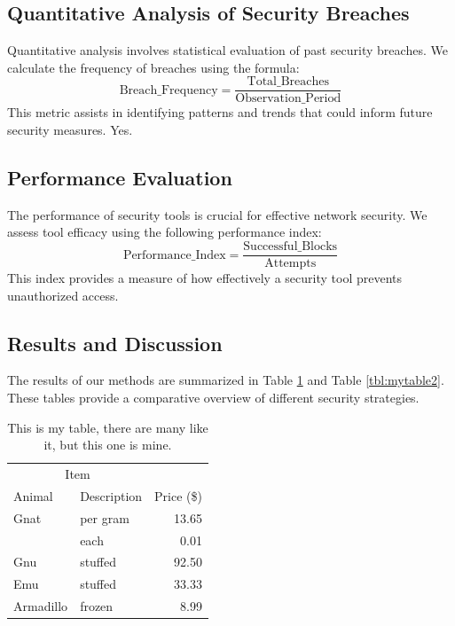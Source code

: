 \documentclass[a4paper,conference]{IEEEtran}
\begin{document}
\subsection{Quantitative Analysis of Security Breaches}

Quantitative analysis involves statistical evaluation of past security breaches.
We calculate the frequency of breaches using the formula:
\begin{equation}
\text{Breach\_Frequency} = \frac{\text{Total\_Breaches}}{\text{Observation\_Period}}
\end{equation}
This metric assists in identifying patterns and trends that could inform future security measures.
Yes.


\subsection{Performance Evaluation}

The performance of security tools is crucial for effective network security.
We assess tool efficacy using the following performance index:
\begin{equation}
\text{Performance\_Index} = \frac{\text{Successful\_Blocks}}{\text{Attempts}}
\end{equation}
This index provides a measure of how effectively a security tool prevents unauthorized access.

\subsection{Results and Discussion}

The results of our methods are summarized in Table \ref{tbl:mytable} and Table \ref{tbl:mytable2}.
These tables provide a comparative overview of different security strategies.

\begin{table}
    \centering
    \caption{This is my table, there are many like it, but this one is mine.}
    \label{tbl:mytable}
    \begin{tabular}{llr}
    \toprule
    \multicolumn{2}{c}{Item} \\
    \cmidrule(r){1-2}
    Animal & Description & Price (\$) \\
    \midrule
    Gnat  & per gram & 13.65 \\
          & each     &  0.01 \\
    Gnu   & stuffed  & 92.50 \\
    Emu   & stuffed  & 33.33 \\
    Armadillo & frozen & 8.99 \\
    \bottomrule
    \end{tabular}
\end{table}
    
\end{document}
